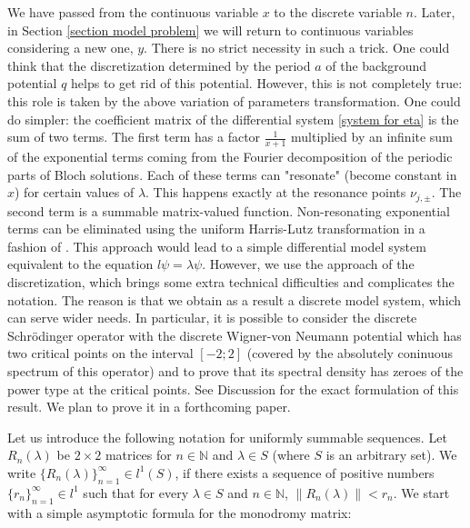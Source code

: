 \documentclass[a4paper,oneside,12pt]{amsart}
\begin{document}
We have passed from the continuous variable $x$ to the discrete variable $n$. Later, in Section \ref{section model problem} we will return to continuous variables considering a new one, $y$. There is no strict necessity in such a trick. One could think that the discretization determined by the period $a$ of the background potential $q$ helps to get rid of this potential. However, this is not completely true: this role is taken by the above variation of parameters transformation. One could do simpler: the coefficient matrix of the differential system \eqref{system for eta} is the sum of two terms. The first term has a factor $\frac1{x+1}$ multiplied by an infinite sum of the exponential terms coming from the Fourier decomposition of the periodic parts of Bloch solutions. Each of these terms can "resonate" (become constant in $x$) for certain values of $\lambda$. This happens exactly at the resonance points $\nu_{j,\pm}$. The second term is a summable matrix-valued function. Non-resonating exponential terms can be eliminated using the uniform Harris-Lutz transformation in a fashion of \cite{Kurasov-Simonov-2011}. This approach would lead to a simple differential model system equivalent to the equation $l\psi=\lambda\psi$. However, we use the approach of the discretization, which brings some extra technical difficulties and complicates the notation. The reason is that we obtain as a result a discrete model system, which can serve wider needs. In particular, it is possible to consider the discrete Schr\"odinger operator with the discrete Wigner-von Neumann potential which has two critical points on the interval $[-2;2]$ (covered by the absolutely coninuous spectrum of this operator) and to prove that its spectral density has zeroes of the power type at the critical points. See Discussion for the exact formulation of this result. We plan to prove it in a forthcoming paper.

Let us introduce the following notation for uniformly summable sequences. Let $R_n(\lambda)$ be $2\times2$ matrices for $n\in\mathbb N$ and $\lambda\in S$ (where $S$ is an arbitrary set). We write $\{R_n(\lambda)\}_{n=1}^{\infty}\in l^1(S)$, if there exists a sequence of positive numbers $\{r_n\}_{n=1}^{\infty}\in l^1$ such that for every $\lambda\in S$ and $n\in\mathbb N$, $\|R_n(\lambda)\|<r_n$. We start with a simple asymptotic formula for the monodromy matrix:
\end{document}
